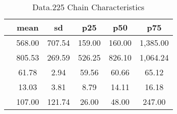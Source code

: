 \begin{table}[htbp]
\caption{\label{clabel} Data.225 Chain Characteristics}\centering\medskip
\begin{tabular}{lccccc} \hline \hline
 & mean  & sd  & p25  & p50  & p75  \\  \hline 
 &       568.00 &       707.54 &       159.00 &       160.00 &     1,385.00 \\  
 &       805.53 &       269.59 &       526.25 &       826.10 &     1,064.24 \\  
 &        61.78 &         2.94 &        59.56 &        60.66 &        65.12 \\  
 &        13.03 &         3.81 &         8.79 &        14.11 &        16.18 \\  
 &       107.00 &       121.74 &        26.00 &        48.00 &       247.00 \\  
\hline \hline \end{tabular}
\end{table}
